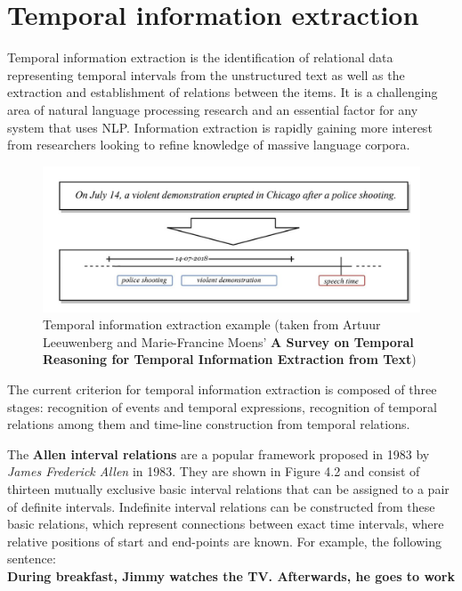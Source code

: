 \documentclass{report}
\begin{document}
\section{Temporal information extraction}
Temporal information extraction is the identification of relational data representing temporal intervals from the unstructured text as well as the extraction and establishment of relations between the items. It is a challenging area of natural language processing research and an essential factor for any system that uses NLP. Information extraction is rapidly gaining more interest from researchers looking to refine knowledge of massive language corpora.\par

\begin{figure}[h]
\centering
\centerline{\includegraphics[width=1\textwidth]{tee}}
\caption{Temporal information extraction example (taken from Artuur Leeuwenberg and Marie-Francine Moens' \textbf{A Survey on Temporal Reasoning for Temporal Information Extraction from Text})}
\end{figure}

The current criterion for temporal information extraction is composed of three stages: recognition of events and temporal expressions, recognition of temporal relations among them and time-line construction from temporal relations. \par

The \textbf{Allen interval relations} are a popular framework proposed in 1983 by \textit{James Frederick Allen} in 1983. They are shown in Figure 4.2 and consist of thirteen mutually exclusive basic interval relations that can be assigned to a pair of definite intervals.
Indefinite interval relations can be constructed from these basic relations, which represent connections between exact time intervals, where relative positions of start and end-points are known. For example, the following sentence:\\

\textbf{During breakfast, Jimmy watches the TV. Afterwards, he goes to work}\\
\end{document}
